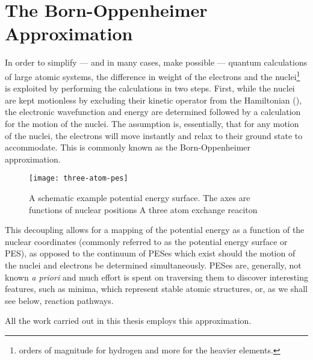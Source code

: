 \section{The Born-Oppenheimer Approximation}
\label{sec:born-oppenheimer}
In order to simplify --- and in many cases, make possible --- quantum calculations of large atomic systems, the difference in weight of the electrons and the nuclei\footnote{ orders of magnitude for hydrogen and more for the heavier elements.} is exploited by performing the calculations in two steps.
First, while the nuclei are kept motionless by excluding their kinetic operator from the Hamiltonian (), the electronic wavefunction and energy are determined followed by a calculation for the motion of the nuclei.
The assumption is, essentially, that for any motion of the nuclei, the electrons will move instantly and relax to their ground state to accommodate.
This is commonly known as the Born-Oppenheimer approximation.~\cite{born-oppenheimer-1927}

\begin{figure}[h]
  \begin{center}
    \texttt{[image: three-atom-pes]}
\parbox{0.85\linewidth}{
    \caption{
A schematic example potential energy surface.
The axes are functions of nuclear positions
A three atom exchange reaciton
}
\label{fig:dimer-force-overview}
}
  \end{center}
\end{figure}


This decoupling allows for a mapping of the potential energy as a function of the nuclear coordinates (commonly referred to as the potential energy surface or PES), as opposed to the continuum of PESes which exist should the motion of the nuclei and electrons be determined simultaneously.
PESes are, generally, not known \textit{a priori} and much effort is spent on traversing them to discover interesting features, such as minima, which represent stable atomic structures, or, as we shall see below, reaction pathways.


All the work carried out in this thesis employs this approximation.
